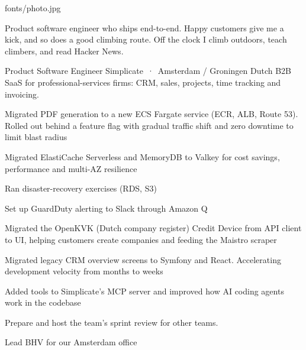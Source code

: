 




\begin{CVHeader}{fonts/photo.jpg}
\end{CVHeader}

Product software engineer who ships end-to-end. Happy customers give me a kick, and so does a good climbing route. Off the clock I climb outdoors, teach climbers, and read Hacker News.


{Product Software Engineer}
{Simplicate \,·\, Amsterdam / Groningen}
{Dutch B2B SaaS for professional-services firms: CRM, sales, projects, time tracking and invoicing.}
{%
\begin{compactitem}
  \item Migrated PDF generation to a new ECS Fargate service (ECR, ALB, Route 53).
    Rolled out behind a feature flag with gradual traffic shift and zero downtime to limit blast radius
  \item Migrated ElastiCache Serverless and MemoryDB to Valkey for cost savings, performance and multi-AZ resilience
  \item Ran disaster-recovery exercises (RDS, S3)
  \item Set up GuardDuty alerting to Slack through Amazon Q
\end{compactitem}

\begin{compactitem}
  \item Migrated the OpenKVK (Dutch company register) Credit Device from API client to UI,
    helping customers create companies and feeding the Maistro scraper
  \item Migrated legacy CRM overview screens to Symfony and React. Accelerating development velocity from months to weeks
  \item Added tools to Simplicate's MCP server and improved how AI coding agents work in the codebase
\end{compactitem}

\begin{compactitem}
  \item Prepare and host the team's sprint review for other teams.
  \item Lead BHV for our Amsterdam office
\end{compactitem}
}

